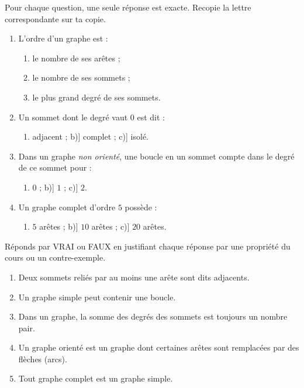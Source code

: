 \documentclass[11pt]{article}
\newcommand{\cle}[1]{{\popxbold\color{popdark}#1}}
\begin{document}
\begin{exercice}
Pour chaque question, une seule réponse est exacte. Recopie la lettre correspondante sur ta copie.
\begin{enumerate}
\item L'\cle{ordre} d'un graphe est :
\begin{enumerate}
\item[a)] le nombre de ses arêtes ;
\item[b)] le nombre de ses sommets ;
\item[c)] le plus grand degré de ses sommets.
\end{enumerate}
\item Un sommet dont le degré vaut $0$ est dit :
\begin{enumerate}
\item[a)] adjacent ; \quad b)] complet ; \quad c)] isolé.
\end{enumerate}
\item Dans un graphe \emph{non orienté}, une \cle{boucle} en un sommet compte dans le degré de ce sommet pour :
\begin{enumerate}
\item[a)] $0$ ; \quad b)] $1$ ; \quad c)] $2$.
\end{enumerate}
\item Un graphe complet d'ordre $5$ possède :
\begin{enumerate}
\item[a)] $5$ arêtes ; \quad b)] $10$ arêtes ; \quad c)] $20$ arêtes.
\end{enumerate}
\end{enumerate}
\end{exercice}

\begin{exercice}
Réponds par VRAI ou FAUX en justifiant chaque réponse par une propriété du cours ou un contre-exemple.
\begin{enumerate}
\item Deux sommets reliés par au moins une arête sont dits adjacents.
\item Un graphe simple peut contenir une boucle.
\item Dans un graphe, la somme des degrés des sommets est toujours un nombre pair.
\item Un graphe orienté est un graphe dont certaines arêtes sont remplacées par des flèches (arcs).
\item Tout graphe complet est un graphe simple.
\end{enumerate}
\end{exercice}
\end{document}
